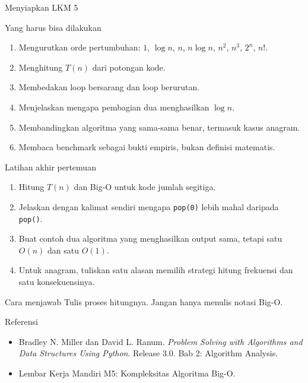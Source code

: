\documentclass[aspectratio=169,11pt]{beamer}
\begin{document}
\begin{frame}{Menyiapkan LKM 5}
\begin{block}{Yang harus bisa dilakukan}
\begin{enumerate}
\item Mengurutkan orde pertumbuhan: $1$, $\log n$, $n$, $n\log n$, $n^2$, $n^3$, $2^n$, $n!$.
\item Menghitung $T(n)$ dari potongan kode.
\item Membedakan loop bersarang dan loop berurutan.
\item Menjelaskan mengapa pembagian dua menghasilkan $\log n$.
\item Membandingkan algoritma yang sama-sama benar, termasuk kasus anagram.
\item Membaca benchmark sebagai bukti empiris, bukan definisi matematis.
\end{enumerate}
\end{block}
\end{frame}

\begin{frame}{Latihan akhir pertemuan}
\begin{enumerate}
\item Hitung $T(n)$ dan Big-O untuk kode jumlah segitiga.
\item Jelaskan dengan kalimat sendiri mengapa \texttt{pop(0)} lebih mahal daripada \texttt{pop()}.
\item Buat contoh dua algoritma yang menghasilkan output sama, tetapi satu $O(n)$ dan satu $O(1)$.
\item Untuk anagram, tuliskan satu alasan memilih strategi hitung frekuensi dan satu konsekuensinya.
\end{enumerate}
\vspace{2mm}
\begin{alertblock}{Cara menjawab}
Tulis proses hitungnya. Jangan hanya menulis notasi Big-O.
\end{alertblock}
\end{frame}

\begin{frame}{Referensi}
\small
\begin{itemize}
\item Bradley N. Miller dan David L. Ranum. \textit{Problem Solving with Algorithms and Data Structures Using Python}. Release 3.0. Bab 2: Algorithm Analysis.
\item Lembar Kerja Mandiri M5: Kompleksitas Algoritma Big-O.
\end{itemize}
\end{frame}
\end{document}

